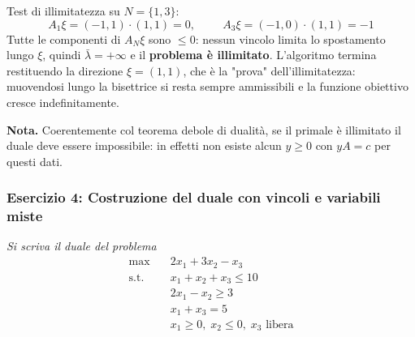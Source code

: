 \documentclass[12pt]{extarticle} %
\begin{document}
\noindent Test di illimitatezza su $N = \{1,3\}$:
\[
A_1\xi = (-1,1)\cdot(1,1) = 0, \hspace{1cm} A_3\xi = (-1,0)\cdot(1,1) = -1
\]
Tutte le componenti di $A_N\xi$ sono $\le 0$: nessun vincolo limita lo spostamento lungo $\xi$, quindi $\bar{\lambda} = +\infty$ e il \textbf{problema è illimitato}. L'algoritmo termina restituendo la direzione $\xi = (1,1)$, che è la "prova" dell'illimitatezza: muovendosi lungo la bisettrice si resta sempre ammissibili e la funzione obiettivo cresce indefinitamente.

\noindent\textbf{Nota.} Coerentemente col teorema debole di dualità, se il primale è illimitato il duale deve essere impossibile: in effetti non esiste alcun $y \ge 0$ con $yA = c$ per questi dati.

\subsubsection{Esercizio 4: Costruzione del duale con vincoli e variabili miste}
\textit{Si scriva il duale del problema}
\[
\begin{aligned}
\max \quad & 2x_1 + 3x_2 - x_3 \\
\text{s.t.} \quad & x_1 + x_2 + x_3 \le 10 \\
& 2x_1 - x_2 \ge 3 \\
& x_1 + x_3 = 5 \\
& x_1 \ge 0, \; x_2 \le 0, \; x_3 \text{ libera}
\end{aligned}
\]
\end{document}
